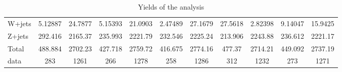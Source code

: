 \documentclass[10pt]{article}
\begin{document}
\begin{table}[htbp]
\begin{center}
\begin{tabular}{|l|S|S|S|S|S|S|S|S|S|S|}
  W+jets   & 5.12887  & 24.7877  & 5.15393  & 21.0903  & 2.47489  & 27.1679  & 27.5618  & 2.82398  & 9.14047  & 15.9425  \\ 
  Z+jets   & 292.416  & 2165.37  & 235.993  & 2221.79  & 232.546  & 2225.24  & 213.906  & 2243.88  & 236.612  & 2221.17  \\ 
\hline 
  Total  & 488.884  & 2702.23  & 427.718  & 2759.72  & 416.675  & 2774.16  & 477.37  & 2714.21  & 449.092  & 2737.19  \\ 
\hline 
  data   & 283 & 1261 & 266 & 1278 & 258 & 1286 & 312 & 1232 & 273 & 1271 \\ 
\hline 
\end{tabular} 
\caption{Yields of the analysis} 
\end{center} 
\end{table} 
\end{document}
